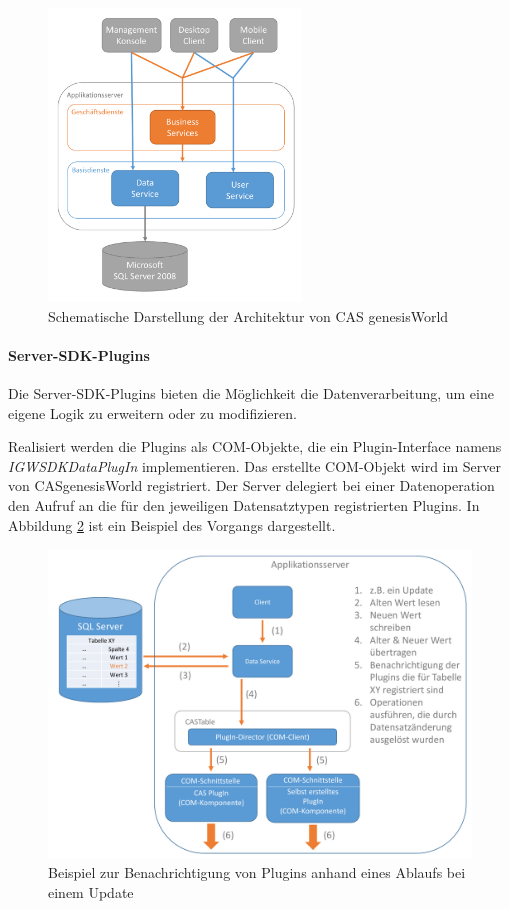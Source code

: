 \begin{figure}[H]
	\centering
  \includegraphics[width=0.6\textwidth, width=0.6\textwidth]{pics/GenesisWorld_Architektur.pdf}
	\caption{Schematische Darstellung der Architektur von CAS genesisWorld}
	\label{gw_Architektur}
\end{figure}

\paragraph{Server-SDK-Plugins}

Die Server-SDK-Plugins bieten die Möglichkeit die Datenverarbeitung, um eine eigene Logik zu erweitern oder zu modifizieren. 

Realisiert werden die Plugins als COM-Objekte, die ein Plugin-Interface namens \textit{IGWSDKDataPlugIn} implementieren. Das erstellte COM-Objekt wird im Server von CASgenesisWorld registriert. Der Server delegiert bei einer Datenoperation den Aufruf an die für den jeweiligen Datensatztypen registrierten Plugins. In Abbildung \ref{gw_plugin} ist ein Beispiel des Vorgangs dargestellt.

\begin{figure}[H]
	\centering
  \includegraphics[width=1.0\textwidth, width=1.0\textwidth]{pics/analyse_plugins.pdf}
	\caption{Beispiel zur Benachrichtigung von Plugins anhand eines Ablaufs bei einem Update}
	\label{gw_plugin}
\end{figure}

